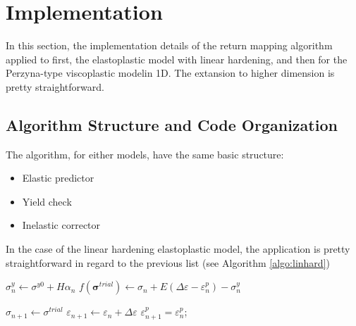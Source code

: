 \documentclass[final,5p,times,twocolumn]{elsarticle}
\begin{document}
\section{Implementation}
\label{sect:Implementation}
In this section, the implementation details of the return mapping algorithm applied to first, the elastoplastic model with linear hardening, and then for the Perzyna-type viscoplastic modelin 1D. The extansion to higher dimension is pretty straightforward.

\subsection{Algorithm Structure and Code Organization}
\label{Algorithm Structure}
The algorithm, for either models, have the same basic structure:
\begin{itemize}
  \item Elastic predictor
  \item Yield check
  \item Inelastic corrector
\end{itemize}

In the case of the linear hardening elastoplastic model, the application is pretty straightforward in regard to the previous list (see Algorithm \ref{algo:linhard})
\begin{algorithm}
  $\sigma_n^y \gets \sigma^{y0} + H\alpha_n$\;
  $f(\boldsymbol{\sigma}^{trial}) \gets \sigma_n + E(\Delta\varepsilon - \varepsilon^p_n) - \sigma^y_n$\;
  {
    $\sigma_{n+1} \gets \sigma^{trial}$\;
    $\varepsilon_{n+1} \gets \varepsilon_n + \Delta\varepsilon$\;
    $\varepsilon_{n+1}^p=\varepsilon^p_n$;

  }
  
  \;
  \caption{{\sc LinearHardeningReturnMapping} Solve the stress state for next stress increment using return mapping for the linear hardening elasto-plastic model}
  \label{algo:linhard}
\end{algorithm}
\end{document}

